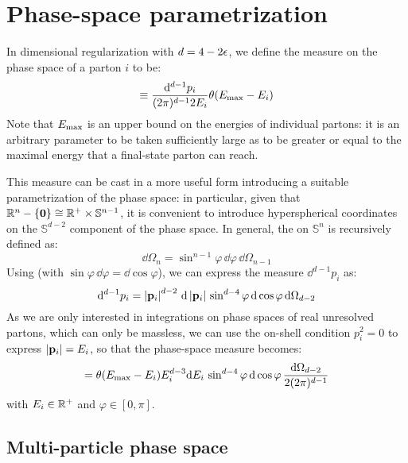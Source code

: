 
\section{Phase-space parametrization}
\label{sec:ph-sp-p}

In dimensional regularization with $ d = 4 - 2 \epsilon $, we define the measure on the phase space of a parton $ i $ to be:
\begin{equation}
  [\dd p_i] \equiv \frac{\dd^{d-1} p_i}{(2\pi)^{d-1} 2E_i} \theta(\ema - E_i)
\end{equation}
Note that $ E_\text{max} $ is an upper bound on the energies of individual partons: it is an arbitrary parameter to be taken sufficiently large as to be greater or equal to the maximal energy that a final-state parton can reach.

This measure can be cast in a more useful form introducing a suitable parametrization of the phase space: in particular, given that $ \mathbb{R}^n-\{\mathbf{0}\} \cong \mathbb{R}^+ \times \mathbb{S}^{n-1} $, it is convenient to introduce hyperspherical coordinates on the $ \mathbb{S}^{d-2} $ component of the phase space. In general, the  on $ \mathbb{S}^n $ is recursively defined as:
\begin{equation}
  \dd \Omega_n = \sin^{n-1} \varphi \, \dd \varphi \, \dd \Omega_{n-1}
  \label{eq:hyp-rec}
\end{equation}
Using  (with $ \sin \varphi \, \dd \varphi = \dd \cos \varphi $), we can express the measure $ \dd^{d-1} p_i $ as:
\begin{equation}
  \mathrm{d}^{d-1} p_i = \left\lvert\mathbf{p}_i\right\rvert^{d-2} \, \mathrm{d} \left\lvert\mathbf{p}_i\right\rvert \, \sin^{d-4} \varphi \, \mathrm{d} \cos \varphi \, \mathrm{d} \Omega_{d-2}
\end{equation}
As we are only interested in integrations on phase spaces of real unresolved partons, which can only be massless, we can use the on-shell condition $ p_i^2 = 0 $ to express $ \left\lvert\mathbf{p}_i\right\rvert = E_i $, so that the phase-space measure becomes:
\begin{equation}
  [\dd p_i] = \theta(\ema - E_i) E_i^{d-3} \dd E_i \, \sin^{d-4} \varphi \, \dd \cos \varphi \, \frac{\dd \Omega_{d-2}}{2(2\pi)^{d-1}}
\end{equation}
with $ E_i \in \mathbb{R}^+ $ and $ \varphi \in [0,\pi] $.

\subsection{Multi-particle phase space}

